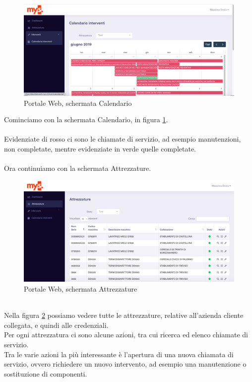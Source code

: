 \begin{figure}[!h] 
	\centering 
	\includegraphics[scale = 0.3]{immagini/portale/calendario.png} 
	\caption {Portale Web, schermata Calendario}
	\label{fig:2-7}
\end{figure}
Cominciamo con la schermata Calendario, in figura \ref{fig:2-7}.\\
\\Evidenziate di rosso ci sono le chiamate di servizio, ad esempio manutenzioni, non completate, mentre evidenziate in verde quelle completate.\\\\
Ora continuiamo con la schermata Attrezzature.\\
\begin{figure}[!h] 
	\centering 
	\includegraphics[scale = 0.25]{immagini/portale/attrezzature.png} 
	\caption {Portale Web, schermata Attrezzature}
	\label{fig:2-8}
\end{figure}
\\Nella figura \ref{fig:2-8} possiamo vedere tutte le attrezzature, relative all'azienda cliente collegata, e quindi alle credenziali.\\
Per ogni attrezzatura ci sono alcune azioni, tra cui ricerca ed elenco chiamate di servizio.\\Tra le varie azioni la più interessante è l'apertura di una nuova chiamata di servizio, ovvero richiedere un nuovo intervento, ad esempio una manutenzione o sostituzione di componenti.\\\\
